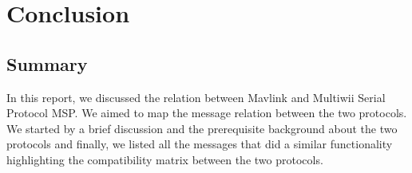 \chapter {Conclusion}

\section{Summary}

In this report, we discussed the relation between Mavlink and Multiwii Serial Protocol MSP.
We aimed to map the message relation between the two protocols.
We started by a brief discussion and the prerequisite background about the two protocols and finally, we listed all the messages that did a similar functionality highlighting the compatibility matrix between the two protocols.
 
